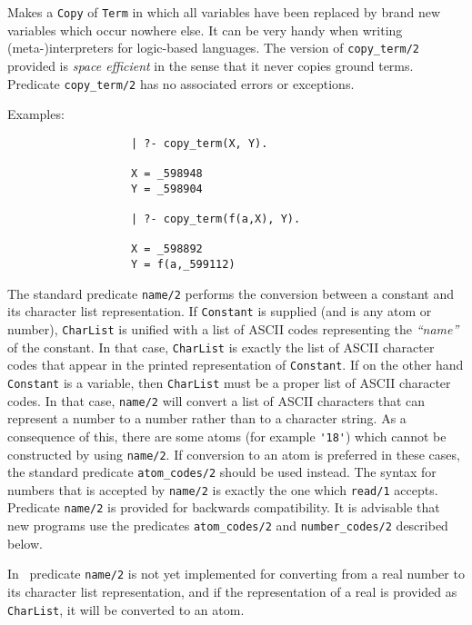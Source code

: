 \begin{description}
    Makes a {\tt Copy} of {\tt Term} in which all variables have been
    replaced by brand new variables which occur nowhere else. It can
    be very handy when writing (meta-)interpreters for logic-based
    languages.  The version of {\tt copy\_term/2} provided is {\em space
    efficient} in the sense that it never copies ground terms. 
    Predicate {\tt copy\_term/2} has no associated errors or exceptions.

    Examples:
    {\footnotesize
     \begin{verbatim}
                   | ?- copy_term(X, Y).

                   X = _598948
                   Y = _598904

                   | ?- copy_term(f(a,X), Y).

                   X = _598892
                   Y = f(a,_599112)
     \end{verbatim}}

    The standard predicate {\tt name/2} performs the conversion 
    between a constant and its character list representation. 
    If {\tt Constant} is supplied (and is any atom or number), {\tt CharList} 
    is unified with a list of ASCII codes representing the {\em ``name''} 
    of the constant.  In that case, {\tt CharList} is exactly the list of 
    ASCII character codes that appear in the printed representation of 
    {\tt Constant}\@.  If on the other hand {\tt Constant} is a variable, 
    then {\tt CharList} must be a proper list of ASCII character codes. 
    In that case, {\tt name/2} will convert a list of ASCII characters 
    that can represent a number to a number rather than to a character string.
    As a consequence of this, there are some atoms (for example \verb|'18'|)
    which cannot be constructed by using {\tt name/2}\@. 
    If conversion to an atom is preferred in these cases, the 
    standard predicate {\tt atom\_codes/2} should be used instead. The 
    syntax for numbers that is accepted by {\tt name/2} is exactly the one 
    which {\tt read/1} accepts.  Predicate {\tt name/2} is provided for 
    backwards compatibility.  It is advisable that new programs use
    the predicates {\tt atom\_codes/2} and {\tt number\_codes/2} described
    below.

    In \version\ predicate {\tt name/2} is not yet implemented for 
    converting from a real number to its character list representation, 
    and if the representation of a real is provided as {\tt CharList}, 
    it will be converted to an atom.


\end{description}

